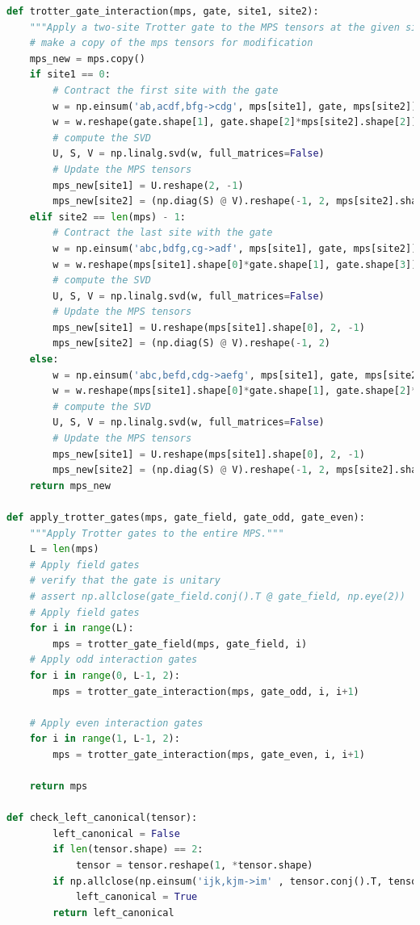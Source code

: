 \documentclass[12pt]{article}
\begin{document}
\begin{lstlisting}[language=Python]
def trotter_gate_interaction(mps, gate, site1, site2):
    """Apply a two-site Trotter gate to the MPS tensors at the given sites."""
    # make a copy of the mps tensors for modification
    mps_new = mps.copy()
    if site1 == 0:
        # Contract the first site with the gate
        w = np.einsum('ab,acdf,bfg->cdg', mps[site1], gate, mps[site2])
        w = w.reshape(gate.shape[1], gate.shape[2]*mps[site2].shape[2])
        # compute the SVD
        U, S, V = np.linalg.svd(w, full_matrices=False)
        # Update the MPS tensors
        mps_new[site1] = U.reshape(2, -1)
        mps_new[site2] = (np.diag(S) @ V).reshape(-1, 2, mps[site2].shape[2])
    elif site2 == len(mps) - 1:
        # Contract the last site with the gate
        w = np.einsum('abc,bdfg,cg->adf', mps[site1], gate, mps[site2])
        w = w.reshape(mps[site1].shape[0]*gate.shape[1], gate.shape[3])
        # compute the SVD
        U, S, V = np.linalg.svd(w, full_matrices=False)
        # Update the MPS tensors
        mps_new[site1] = U.reshape(mps[site1].shape[0], 2, -1)
        mps_new[site2] = (np.diag(S) @ V).reshape(-1, 2)
    else:
        w = np.einsum('abc,befd,cdg->aefg', mps[site1], gate, mps[site2])
        w = w.reshape(mps[site1].shape[0]*gate.shape[1], gate.shape[2]*mps[site2].shape[2])
        # compute the SVD
        U, S, V = np.linalg.svd(w, full_matrices=False)
        # Update the MPS tensors
        mps_new[site1] = U.reshape(mps[site1].shape[0], 2, -1)
        mps_new[site2] = (np.diag(S) @ V).reshape(-1, 2, mps[site2].shape[2])
    return mps_new

def apply_trotter_gates(mps, gate_field, gate_odd, gate_even):
    """Apply Trotter gates to the entire MPS."""
    L = len(mps)
    # Apply field gates
    # verify that the gate is unitary
    # assert np.allclose(gate_field.conj().T @ gate_field, np.eye(2))
    # Apply field gates
    for i in range(L):
        mps = trotter_gate_field(mps, gate_field, i)
    # Apply odd interaction gates
    for i in range(0, L-1, 2):
        mps = trotter_gate_interaction(mps, gate_odd, i, i+1)
    
    # Apply even interaction gates
    for i in range(1, L-1, 2):
        mps = trotter_gate_interaction(mps, gate_even, i, i+1)
    
    return mps

def check_left_canonical(tensor):
        left_canonical = False 
        if len(tensor.shape) == 2:
            tensor = tensor.reshape(1, *tensor.shape)
        if np.allclose(np.einsum('ijk,kjm->im' , tensor.conj().T, tensor), np.eye(tensor.shape[2])):
            left_canonical = True
        return left_canonical


\end{lstlisting}
\end{document}
